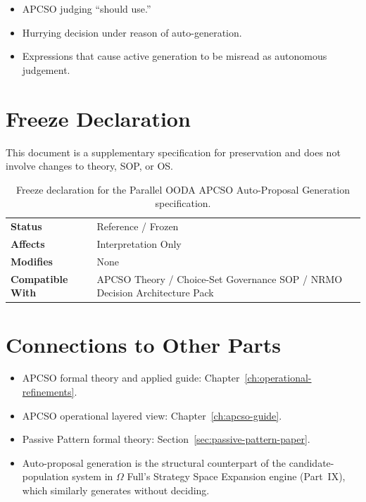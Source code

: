 \begin{itemize}
\item APCSO judging ``should use.''
\item Hurrying decision under reason of auto-generation.
\item Expressions that cause active generation to be misread as
autonomous judgement.
\end{itemize}

\section{Freeze Declaration}
\label{sec:parallel-ooda-freeze}

This document is a supplementary specification for preservation and
does not involve changes to theory, SOP, or OS.

\begin{table}[ht]
\centering
\small
\begin{tabular}{ll}
\toprule
\textbf{Status} & Reference / Frozen \\
\textbf{Affects} & Interpretation Only \\
\textbf{Modifies} & None \\
\textbf{Compatible With} & APCSO Theory / Choice-Set Governance SOP /
NRMO Decision Architecture Pack \\
\bottomrule
\end{tabular}
\caption[Parallel OODA freeze declaration]{Freeze declaration for
the Parallel OODA APCSO Auto-Proposal Generation specification.}
\label{tab:parallel-ooda-freeze}
\end{table}

\section*{Connections to Other Parts}

\begin{itemize}
\item APCSO formal theory and applied guide: Chapter~\ref{ch:operational-refinements}.
\item APCSO operational layered view: Chapter~\ref{ch:apcso-guide}.
\item Passive Pattern formal theory:
Section~\ref{sec:passive-pattern-paper}.
\item Auto-proposal generation is the structural counterpart of the
candidate-population system in $\Omega$ Full's Strategy Space
Expansion engine (Part~IX), which similarly generates without
deciding.
\end{itemize}
